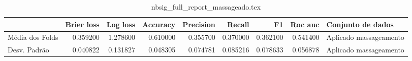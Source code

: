 \begin{table}
\centering
\caption{nbsig_full_report_massageado.tex}
\label{nbsig_full_report_massageado.tex}
\begin{tabular}{lrrrrrrrl}
\toprule
{} &  Brier  loss &  Log loss &  Accuracy  &  Precision  &   Recall  &       F1  &  Roc auc  &       Conjunto de dados \\
\midrule
Média dos Folds &     0.359200 &  1.278600 &   0.610000 &    0.355700 &  0.370000 &  0.362100 &  0.541400 &  Aplicado massageamento \\
Desv. Padrão    &     0.040822 &  0.131827 &   0.048305 &    0.074781 &  0.085216 &  0.078633 &  0.056878 &  Aplicado massageamento \\
\bottomrule
\end{tabular}
\end{table}
